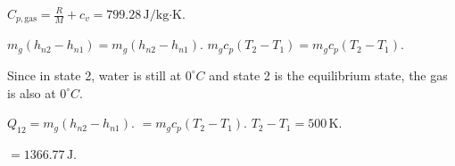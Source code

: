 \( C_{p,\text{gas}} = \frac{R}{M} + c_v = 799.28 \, \text{J/kg·K} \).  

\( m_g (h_{n2} - h_{n1}) = m_g (h_{n2} - h_{n1}) \).  
\( m_g c_p (T_2 - T_1) = m_g c_p (T_2 - T_1) \).  

Since in state 2, water is still at \( 0^\circ C \) and state 2 is the equilibrium state, the gas is also at \( 0^\circ C \).  

\( Q_{12} = m_g (h_{n2} - h_{n1}) \).  
\( = m_g c_p (T_2 - T_1) \).  
\( T_2 - T_1 = 500 \, \text{K} \).  

\( = 1366.77 \, \text{J} \).